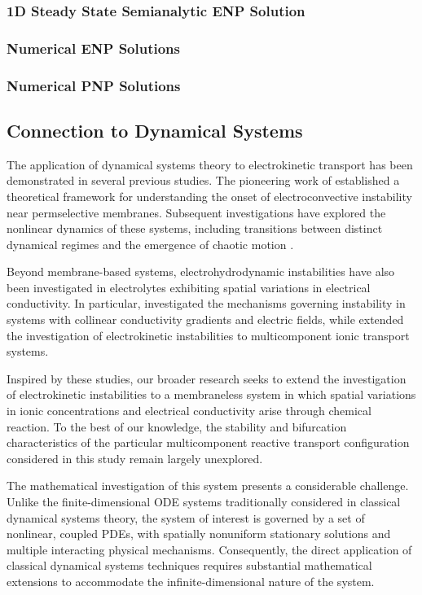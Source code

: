 \documentclass[11pt]{article}
\begin{document}
\subsubsection{1D Steady State Semianalytic ENP Solution}

\subsubsection{Numerical ENP Solutions}

\subsubsection{Numerical PNP Solutions}


\subsection{Connection to Dynamical Systems}

The application of dynamical systems theory to
electrokinetic transport has been demonstrated in
several previous studies. The pioneering work of
\textcite{rubinstein2000electro} established a
theoretical framework for understanding the onset
of electroconvective instability near permselective
membranes. Subsequent investigations have explored
the nonlinear dynamics of these systems, including
transitions between distinct dynamical regimes and
the emergence of chaotic motion
\parencite{davidson2016dynamical,demekhin2013direct}.

Beyond membrane-based systems, electrohydrodynamic
instabilities have also been investigated in
electrolytes exhibiting spatial variations in
electrical conductivity. In particular,
\textcite{sharan2017mechanism} investigated the
mechanisms governing instability in systems with
collinear conductivity gradients and electric
fields, while \textcite{oddy2005multiple} extended
the investigation of electrokinetic instabilities
to multicomponent ionic transport systems.

Inspired by these studies, our broader research
seeks to extend the investigation of electrokinetic
instabilities to a membraneless system in which
spatial variations in ionic concentrations and
electrical conductivity arise through chemical
reaction. To the best of our knowledge, the
stability and bifurcation characteristics of the
particular multicomponent reactive transport
configuration considered in this study remain
largely unexplored.

The mathematical investigation of this system
presents a considerable challenge. Unlike the
finite-dimensional ODE systems traditionally
considered in classical dynamical systems theory,
the system of interest is governed by a set of
nonlinear, coupled PDEs, with spatially nonuniform
stationary solutions and multiple interacting
physical mechanisms. Consequently, the direct
application of classical dynamical systems
techniques requires substantial mathematical
extensions to accommodate the infinite-dimensional
nature of the system.
\end{document}
